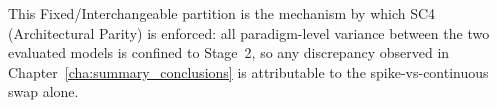 This Fixed/Interchangeable partition is the mechanism by which SC4 (Architectural Parity) is enforced: all paradigm-level variance between the two evaluated models is confined to Stage~2, so any discrepancy observed in Chapter~\ref{cha:summary_conclusions} is attributable to the spike-vs-continuous swap alone.